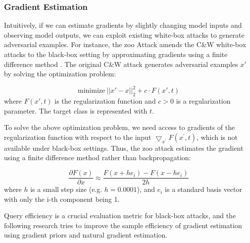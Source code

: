 
\subsubsection{Gradient Estimation}

Intuitively, if we can estimate gradients by slightly changing model inputs and observing model outputs, we can exploit existing white-box attacks to generate adversarial examples. For instance, the \acrfull{zoo} Attack amends the C\&W white-box attacks to the black-box setting by approximating gradients using a finite difference method \citep{chen2017zoo}. The original C\&W attack generates adversarial examples $x'$ by solving the optimization problem:

\begin{equation}
    \text{minimize}\ ||x'-x||^2_2 + c \cdot F(x', t)
\end{equation}
where $F(x', t)$ is the regularization function and $c>0$ is a regularization parameter. The target class is represented with $t$.

To solve the above optimization problem, we need access to gradients of the regularization function with respect to the input $\bigtriangledown_{x^{'}} F(x^{'}, t)$, which is not available under black-box settings. Thus, the \acrshort{zoo} attack estimates the gradient using a finite difference method rather than backpropagation:


\begin{equation}
    \frac{\partial F(x)}{\partial x} \approx \frac{F(x+he_i) - F(x-he_i)}{2h}
\end{equation}
where $h$ is a small step size (e.g. $h = 0.0001$), and $e_i$ is a standard basis vector with only the i-th component being 1.

Query efficiency is a crucial evaluation metric for black-box attacks, and the following research tries to improve the sample efficiency of gradient estimation using gradient priors and natural gradient estimation.


